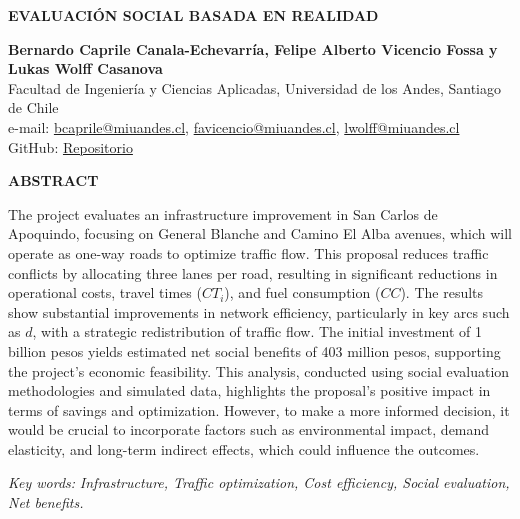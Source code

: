 \documentclass[letterpaper,12pt]{article}
\begin{document}
\begin{titlepage}
    \begin{center}
        
    
    \vspace*{1cm}


    \textbf{\Large EVALUACIÓN SOCIAL BASADA EN REALIDAD}
  
    \vspace{1cm}
    
    \textbf{Bernardo Caprile Canala-Echevarría, Felipe Alberto Vicencio Fossa y Lukas Wolff Casanova}\\
    Facultad de Ingeniería y Ciencias Aplicadas, Universidad de los Andes, Santiago de Chile\\
    e-mail: \href{mailto:bcaprile@miuandes.cl}{bcaprile@miuandes.cl}, \href{mailto:favicencio@miuandes.cl}{favicencio@miuandes.cl}, \href{mailto:lwolff@miuandes.cl}{lwolff@miuandes.cl}\\
    GitHub: \href{https://github.com/LukasWolff2002/TAREA_4_AUTITOS}{Repositorio}
    \vspace{2cm}
    
    \textbf{ABSTRACT}
    \end{center}
    \vspace{0.5cm}
    
    The project evaluates an infrastructure improvement in San Carlos de Apoquindo, focusing on General Blanche and Camino El Alba avenues, which will operate as one-way roads to optimize traffic flow. This proposal reduces traffic conflicts by allocating three lanes per road, resulting in significant reductions in operational costs, travel times ($CT_i$), and fuel consumption ($CC$). The results show substantial improvements in network efficiency, particularly in key arcs such as $d$, with a strategic redistribution of traffic flow. The initial investment of 1 billion pesos yields estimated net social benefits of 403 million pesos, supporting the project's economic feasibility. This analysis, conducted using social evaluation methodologies and simulated data, highlights the proposal's positive impact in terms of savings and optimization. However, to make a more informed decision, it would be crucial to incorporate factors such as environmental impact, demand elasticity, and long-term indirect effects, which could influence the outcomes.


    \vspace{1cm}
    
    \textit{Key words:} \textit{Infrastructure, Traffic optimization, Cost efficiency, Social evaluation, Net benefits.}
    
\end{titlepage}
\end{document}
